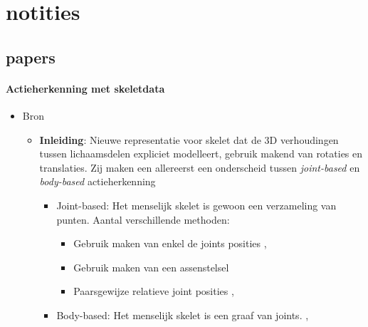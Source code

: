 \chapter{notities}

\section{papers}
\subsubsection{Actieherkenning met skeletdata}
\begin{itemize}
	\item Bron \cite{Vemulapalli2014}
	\begin{itemize}
		\item \textbf{Inleiding}: Nieuwe representatie voor skelet dat de 3D verhoudingen tussen lichaamsdelen expliciet modelleert, gebruik makend van rotaties en translaties. Zij maken een allereerst een onderscheid tussen \textit{joint-based} en \textit{body-based} actieherkenning
		\begin{itemize}
			\item Joint-based: Het menselijk skelet is gewoon een verzameling van punten. Aantal verschillende methoden:
			\begin{itemize}
				\item Gebruik maken van enkel de joints posities \cite{Hussein2011}, \cite{Lv2006}
				\item Gebruik maken van een assenstelsel \cite{Xia2012}
				\item Paarsgewijze relatieve joint posities \cite{Wang2012b}, \cite{Yang2012}
			\end{itemize}
		
			\item Body-based: Het menselijk skelet is een graaf van joints. \cite{Ofli2012}, \cite{Chaudhry2013}
		\end{itemize}


\end{itemize}
\end{itemize}
